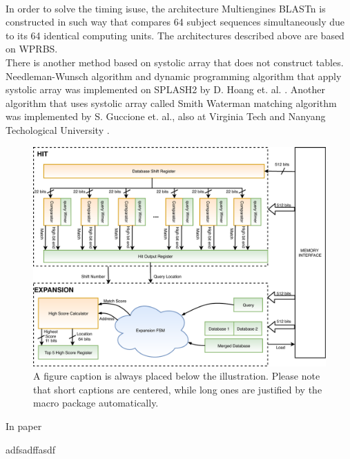 \\
In order to solve the timing isuse, the architecture Multiengines BLASTn \cite{sotiriades2007design} is constructed in such way that compares 64 subject sequences simultaneously due to its 64 identical computing units. The architectures described above are based on WPRBS.
\\
There is another method based on systolic array that does not construct tables. Needleman-Wunsch algorithm \cite{gonnet1992exhaustive} and dynamic programming algorithm that apply systolic array was implemented on SPLASH2 by D. Hoang et. al. \cite{hoang1993searching}. Another algorithm that uses systolic array called Smith Waterman matching algorithm was implemented by S. Guccione et. al., also at Virginia Tech and Nanyang Techological University \cite{yu2003smith}. 

\begin{figure}
\includegraphics[width=\textwidth]{Figures/BlastMachine.pdf}
\caption{A figure caption is always placed below the illustration.
Please note that short captions are centered, while long ones are
justified by the macro package automatically.} \label{fig1}
\end{figure}


In paper \cite{vipin2019}

adfsadffasdf

